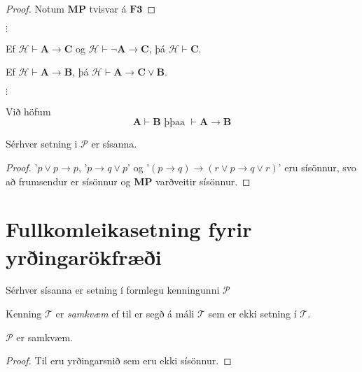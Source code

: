 \documentclass[12pt]{book}
\begin{document}
\begin{proof}
  Notum $\textbf{MP}$ tvisvar á $\textbf{F3}$
\end{proof}

$\vdots$\\


\begin{setn}
  Ef $\mathcal{H} \vdash \textbf{A} \rightarrow \textbf{C}$ og
  $\mathcal{H} \vdash \lnot \textbf{A} \rightarrow \textbf{C}$,
  þá $\mathcal{H} \vdash \textbf{C}$.
\end{setn}

\begin{setn}
    Ef $\mathcal{H} \vdash \textbf{A} \rightarrow \textbf{B}$,
    þá $ \mathcal{H} \vdash \textbf{A} \rightarrow \textbf{C} \vee \textbf{B}$.
\end{setn}


$\vdots$\\

\begin{setn}[Fylgisetning]
  Við höfum
  \[ \mathbf{A} \vdash \mathbf{B} \text{ þþaa } \vdash \mathbf{A} \rightarrow \mathbf{B} \]

\end{setn}

\begin{setn}
  Sérhver setning i $\mathcal{P}$ er sísanna.
  \begin{proof}
    '$p \vee p \rightarrow p$, '$p \rightarrow q \vee p$' og
    '$(p \rightarrow q) \rightarrow (r \vee p \rightarrow q \vee r)$'
    eru sísönnur, svo að frumsendur er sísönnur og \textbf{MP} varðveitir sísönnur.
  \end{proof}
\end{setn}
\section{Fullkomleikasetning fyrir yrðingarökfræði}

Sérhver sísanna er setning í formlegu kenningunni $\mathcal{P}$
\begin{skgr}
  Kenning $\mathcal{T}$ er \emph{samkvæm} ef til er segð á máli $\mathcal{T}$
  sem er ekki setning í $\mathcal{T}$.
\end{skgr}

\begin{setn}
  $\mathcal{P}$ er samkvæm.
    \begin{proof}
      Til eru yrðingarsnið sem eru ekki sísönnur.
    \end{proof}
\end{setn}
\end{document}
